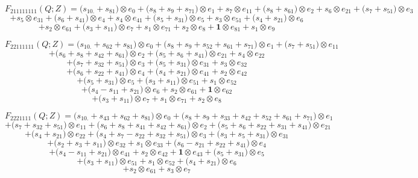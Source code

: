 \documentclass[12pt]{amsart}
\theoremstyle{plain}
\theoremstyle{definition}
\theoremstyle{remark}
\begin{document}
$$F_{ 211111111 }(Q;Z)=
\big( s_{10.} + s_{81} \big) \otimes e_{ 0 }
+\big( s_{8} + s_{9} + s_{71} \big) \otimes e_{ 1 }
+ s_{7} \otimes e_{ 11 }
+\big( s_{8} + s_{61} \big) \otimes e_{ 2 }
+ s_{6} \otimes e_{ 21 }
+\big( s_{7} + s_{51} \big) \otimes e_{ 3 } $$ $$
+ s_{5} \otimes e_{ 31 }
+\big( s_{6} + s_{41} \big) \otimes e_{ 4 }
+ s_{4} \otimes e_{ 41 } 
+\big( s_{5} + s_{31} \big) \otimes e_{ 5 }
+ s_{3} \otimes e_{ 51 } 
+\big( s_{4} + s_{21} \big) \otimes e_{ 6 } $$ $$
+ s_{2} \otimes e_{ 61 }
+\big( s_{3} + s_{11} \big) \otimes e_{ 7 }
+ s_{1} \otimes e_{ 71 }
+ s_{2} \otimes e_{ 8 }
+ \boldsymbol{1} \otimes e_{ 81 }
+ s_{1} \otimes e_{ 9 }
$$

$$F_{ 22111111 }(Q;Z)=
\big( s_{10.} + s_{62} + s_{81} \big) \otimes e_{ 0 }
+\big( s_{8} + s_{9} + s_{52} + s_{61} + s_{71} \big) \otimes e_{ 1 }
+\big( s_{7} + s_{51} \big) \otimes e_{ 11 } $$ $$
+\big( s_{6} + s_{8} + s_{42} + s_{61} \big) \otimes e_{ 2 }
+\big( s_{5} + s_{6} + s_{41} \big) \otimes e_{ 21 }
+ s_{4} \otimes e_{ 22 } $$ $$
+\big( s_{7} + s_{32} + s_{51} \big) \otimes e_{ 3 }
+\big( s_{5} + s_{31} \big) \otimes e_{ 31 }
+ s_{3} \otimes e_{ 32 } $$ $$
+\big( s_{6} + s_{22} + s_{41} \big) \otimes e_{ 4 }
+\big( s_{4} + s_{21} \big) \otimes e_{ 41 }
+ s_{2} \otimes e_{ 42 } $$ $$
+\big( s_{5} + s_{31} \big) \otimes e_{ 5 }
+\big( s_{3} + s_{11} \big) \otimes e_{ 51 }
+ s_{1} \otimes e_{ 52 } $$ $$
+\big( s_{4} - s_{11} + s_{21} \big) \otimes e_{ 6 }
+ s_{2} \otimes e_{ 61 }
+ \boldsymbol{1} \otimes e_{ 62 } $$ $$
+\big( s_{3} + s_{11} \big) \otimes e_{ 7 }
+ s_{1} \otimes e_{ 71 }
+ s_{2} \otimes e_{ 8 }
$$

\vfill\eject
$$F_{ 2221111 }(Q;Z)=
\big( s_{10.} + s_{43} + s_{62} + s_{81} \big) \otimes e_{ 0 }
+\big( s_{8} + s_{9} + s_{33} + s_{42} + s_{52} + s_{61} + s_{71} \big) \otimes e_{ 1 } $$ $$
+\big( s_{7} + s_{32} + s_{51} \big) \otimes e_{ 11 }
+\big( s_{6} + s_{8} + s_{41} + s_{42} + s_{61} \big) \otimes e_{ 2 }
+\big( s_{5} + s_{6} + s_{22} + s_{31} + s_{41} \big) \otimes e_{ 21 } $$ $$
+\big( s_{4} + s_{21} \big) \otimes e_{ 22 }
+\big( s_{4} + s_{7} - s_{22} + s_{32} + s_{51} \big) \otimes e_{ 3 }
+\big( s_{3} + s_{5} + s_{31} \big) \otimes e_{ 31 } $$ $$
+\big( s_{2} + s_{3} + s_{11} \big) \otimes e_{ 32 }
+ s_{1} \otimes e_{ 33 }
+\big( s_{6} - s_{21} + s_{22} + s_{41} \big) \otimes e_{ 4 } $$ $$
+\big( s_{4} - s_{11} + s_{21} \big) \otimes e_{ 41 }
+ s_{2} \otimes e_{ 42 }
+ \boldsymbol{1} \otimes e_{ 43 }
+\big( s_{5} + s_{31} \big) \otimes e_{ 5 } $$ $$
+\big( s_{3} + s_{11} \big) \otimes e_{ 51 }
+ s_{1} \otimes e_{ 52 }
+\big( s_{4} + s_{21} \big) \otimes e_{ 6 } $$ $$
+ s_{2} \otimes e_{ 61 }
+ s_{3} \otimes e_{ 7 }
$$
\end{document}
